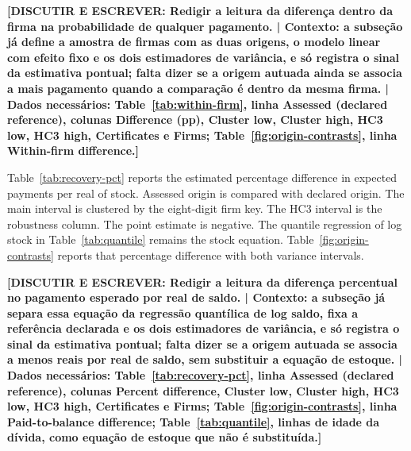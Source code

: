 \textbf{[DISCUTIR E ESCREVER: Redigir a leitura da diferença dentro da firma na probabilidade de qualquer pagamento. | Contexto: a subseção já define a amostra de firmas com as duas origens, o modelo linear com efeito fixo e os dois estimadores de variância, e só registra o sinal da estimativa pontual; falta dizer se a origem autuada ainda se associa a mais pagamento quando a comparação é dentro da mesma firma. | Dados necessários: Table~\ref{tab:within-firm}, linha Assessed (declared reference), colunas Difference (pp), Cluster low, Cluster high, HC3 low, HC3 high, Certificates e Firms; Table~\ref{fig:origin-contrasts}, linha Within-firm difference.]}



Table~\ref{tab:recovery-pct} reports the estimated percentage difference in expected payments per real of stock.
Assessed origin is compared with declared origin.
The main interval is clustered by the eight-digit firm key.
The HC3 interval is the robustness column.
The point estimate is negative.
The quantile regression of log stock in Table~\ref{tab:quantile} remains the stock equation.
Table~\ref{fig:origin-contrasts} reports that percentage difference with both variance intervals.

\textbf{[DISCUTIR E ESCREVER: Redigir a leitura da diferença percentual no pagamento esperado por real de saldo. | Contexto: a subseção já separa essa equação da regressão quantílica de log saldo, fixa a referência declarada e os dois estimadores de variância, e só registra o sinal da estimativa pontual; falta dizer se a origem autuada se associa a menos reais por real de saldo, sem substituir a equação de estoque. | Dados necessários: Table~\ref{tab:recovery-pct}, linha Assessed (declared reference), colunas Percent difference, Cluster low, Cluster high, HC3 low, HC3 high, Certificates e Firms; Table~\ref{fig:origin-contrasts}, linha Paid-to-balance difference; Table~\ref{tab:quantile}, linhas de idade da dívida, como equação de estoque que não é substituída.]}





